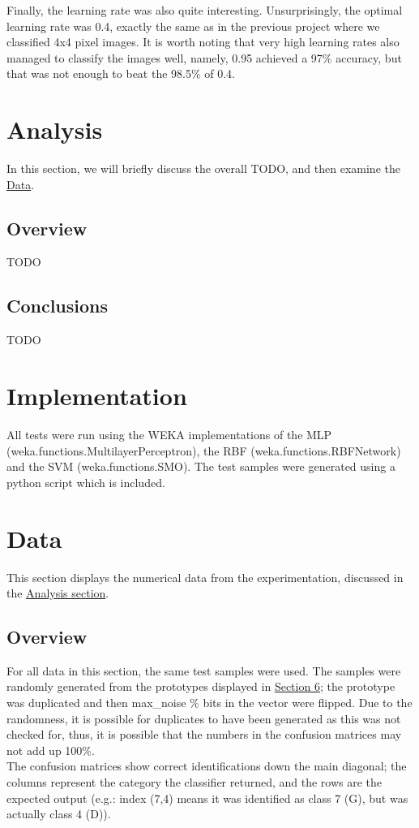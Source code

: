 \documentclass{article}
\begin{document}
		Finally, the learning rate was also quite interesting. Unsurprisingly, the optimal learning rate was 0.4, exactly the same as in the previous project where we classified 4x4 pixel images. It is worth noting that very high learning rates also managed to classify the images well, namely, 0.95 achieved a 97\% accuracy, but that was not enough to beat the 98.5\% of 0.4.\\
	

\pagebreak
\section{Analysis}\label{S3}
	In this section, we will briefly discuss the overall TODO, and then examine the \hyperref[S5]{Data}.\\
	
	\subsection{Overview}
		TODO \\

	
	\subsection{Conclusions}
		TODO \\
	
\section{Implementation}\label{S4}
	All tests were run using the WEKA implementations of the MLP (weka.functions.MultilayerPerceptron), the RBF (weka.functions.RBFNetwork) and the SVM (weka.functions.SMO). The test samples were generated using a python script which is included. \\

\pagebreak
\section{Data} \label{S5}
	This section displays the numerical data from the experimentation, discussed in the \hyperref[S3]{Analysis section}.\\

	\subsection{Overview}\label{S51}
		For all data in this section, the same test samples were used. The samples were randomly generated from the prototypes displayed in \hyperref[S6]{Section 6}; the prototype was duplicated and then max\_noise \% bits in the vector were flipped. Due to the randomness, it is possible for duplicates to have been generated as this was not checked for, thus, it is possible that the numbers in the confusion matrices may not add up 100\%.\\
		The confusion matrices show correct identifications down the main diagonal; the columns represent the category the classifier returned, and the rows are the expected output (e.g.: index (7,4) means it was identified as class 7 (G), but was actually class 4 (D)).
		
\end{document}
